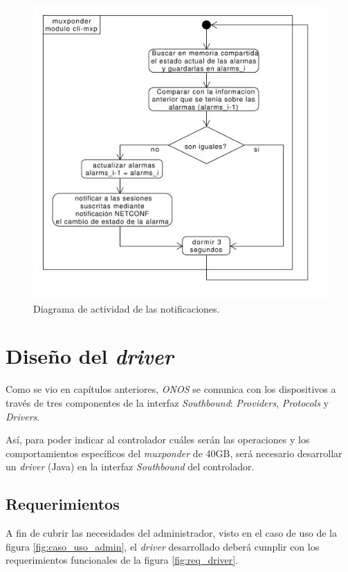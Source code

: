   \begin{figure}[H]
    \centering
    \includegraphics[scale=0.50]{Figures/actividad_modulo_notif.pdf}
    \caption{Diagrama de actividad de las notificaciones.}
    \label{fig:actividad_modulo_notif}
  \end{figure}


  \section{Diseño del \textit{driver}} 
  Como se vio en capítulos anteriores, \textit{ONOS} se comunica con los dispositivos a través de tres componentes de la interfaz \textit{Southbound}: \textit{Providers}, \textit{Protocols} y \textit{Drivers}.
  
  Así, para poder indicar al controlador cuáles serán las operaciones y los comportamientos específicos del \textit{muxponder} de 40GB, será necesario desarrollar un \textit{driver} (Java) en la interfaz \textit{Southbound} del controlador. 

  \subsection{Requerimientos}
  A fin de cubrir las necesidades del administrador, visto en el caso de uso de la figura \ref{fig:caso_uso_admin}, el \textit{driver} desarrollado deberá cumplir con los requerimientos funcionales de la figura \ref{fig:req_driver}.
  
